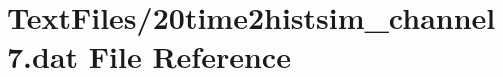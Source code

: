 \hypertarget{20time2histsim__channel7_8dat}{}\section{Text\+Files/20time2histsim\+\_\+channel7.dat File Reference}
\label{20time2histsim__channel7_8dat}
